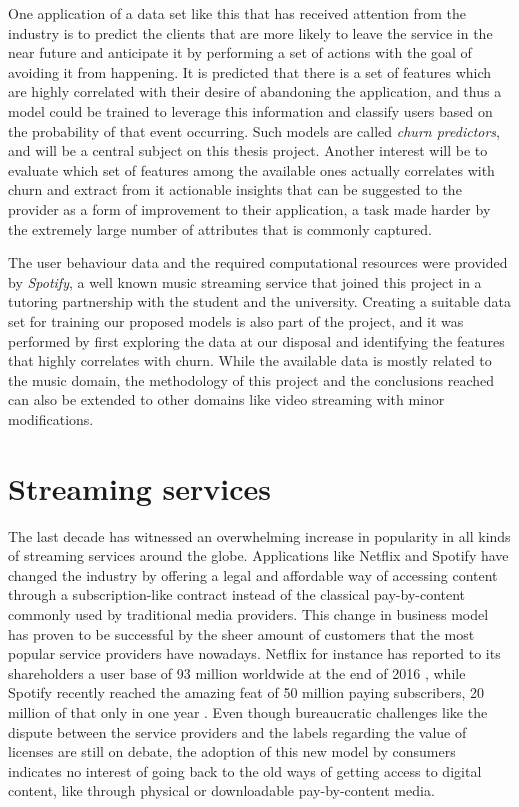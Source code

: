 \documentclass{kththesis}
\begin{document}
	One application of a data set like this that has received attention from the industry is to predict the clients that are more likely to leave the service in the near future and anticipate it by performing a set of actions with the goal of avoiding it from happening. It is predicted that there is a set of features which are highly correlated with their desire of abandoning the application, and thus a model could be trained to leverage this information and classify users based on the probability of that event occurring. Such models are called \emph{churn predictors}, and will be a central subject on this thesis project. Another interest will be to evaluate which set of features among the available ones actually correlates with churn and extract from it actionable insights that can be suggested to the provider as a form of improvement to their application, a task made harder by the extremely large number of attributes that is commonly captured.
	 
	 
	The user behaviour data and the required computational resources were provided by \emph{Spotify}, a well known music streaming service that joined this project in a tutoring partnership with the student and the university. Creating a suitable data set for training our proposed models is also part of the project, and it was performed by first exploring the data at our disposal and identifying the features that highly correlates with churn. While the available data is mostly related to the music domain, the methodology of this project and the conclusions reached can also be extended to other domains like video streaming with minor modifications.
	
	
	\section{Streaming services}

	The last decade has witnessed an overwhelming increase in popularity in all kinds of streaming services around the globe. Applications like Netflix and Spotify have changed the industry by offering a legal and affordable way of accessing content through a subscription-like contract instead of the classical pay-by-content commonly used by traditional media providers. This change in business model has proven to be successful by the sheer amount of customers that the most popular service providers have nowadays. Netflix for instance has reported to its shareholders a user base of 93 million worldwide at the end of 2016 \citep{netflixsh}, while Spotify recently reached the amazing feat of 50 million paying subscribers, 20 million of that only in one year \citep{spotifypress}. Even though bureaucratic challenges like the dispute between the service providers and the labels regarding the value of licenses are still on debate, the adoption of this new model by consumers indicates no interest of going back to the old ways of getting access to digital content, like through physical or downloadable pay-by-content media.
\end{document}
